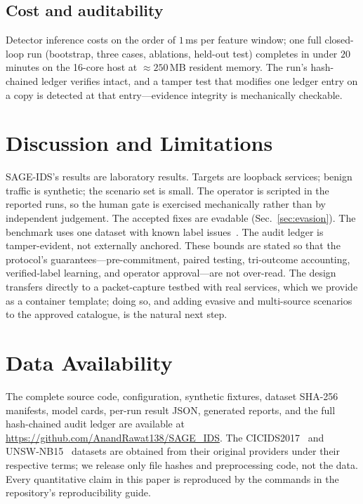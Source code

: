 \documentclass[journal]{IEEEtran}
\newcommand{\sage}{SAGE-IDS}
\begin{document}
\subsection{Cost and auditability}
Detector inference costs on the order of $1$\,ms per feature window; one full closed-loop run
(bootstrap, three cases, ablations, held-out test) completes in under $20$ minutes on the 16-core
host at $\approx 250$\,MB resident memory. The run's hash-chained ledger verifies intact, and a
tamper test that modifies one ledger entry on a copy is detected at that entry---evidence integrity is
mechanically checkable.

\section{Discussion and Limitations}
\label{sec:limits}
\sage{}'s results are laboratory results. Targets are loopback services; benign traffic is synthetic;
the scenario set is small. The operator is scripted in the reported runs, so the human gate is
exercised mechanically rather than by independent judgement. The accepted fixes are evadable
(Sec.~\ref{sec:evasion}). The benchmark uses one dataset with known label
issues~\cite{engelen2021troubleshooting}. The audit ledger is tamper-evident, not externally anchored.
These bounds are stated so that the protocol's guarantees---pre-commitment, paired testing,
tri-outcome accounting, verified-label learning, and operator approval---are not over-read. The design
transfers directly to a packet-capture testbed with real services, which we provide as a container
template; doing so, and adding evasive and multi-source scenarios to the approved catalogue, is the
natural next step.

\section{Data Availability}
The complete source code, configuration, synthetic fixtures, dataset SHA-256 manifests, model cards,
per-run result JSON, generated reports, and the full hash-chained audit ledger are available at
\url{https://github.com/AnandRawat138/SAGE_IDS}. The CICIDS2017~\cite{sharafaldin2018cicids} and
UNSW-NB15~\cite{moustafa2015unsw} datasets are obtained from their original providers under their
respective terms; we release only file hashes and preprocessing code, not the data. Every quantitative
claim in this paper is reproduced by the commands in the repository's reproducibility guide.
\end{document}

